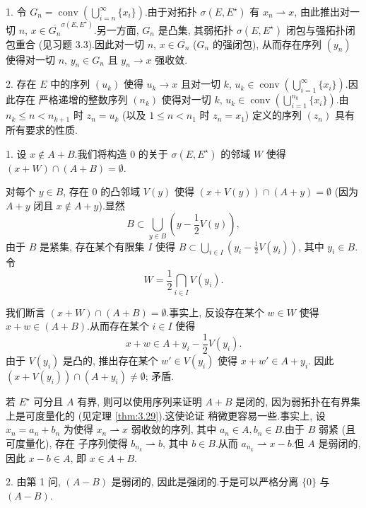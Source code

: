 
1. 令 $G_n=\operatorname{conv}\left(\bigcup_{i=n}^\infty\{x_i\}\right)$.由于对拓扑
$\sigma(E,E^\star)$ 有 $x_n\rightharpoonup x$, 由此推出对一切 $n$,
$x\in\overline{G_n}^{\sigma(E,E^\star)}$.另一方面, $G_n$ 是凸集, 其弱拓扑
$\sigma(E,E^\star)$ 闭包与强拓扑闭包重合 (见习题 3.3).因此对一切 $n$,
$x\in\overline{G_n}$ ($G_n$ 的强闭包), 从而存在序列 $(y_n)$ 使得对一切 $n$,
$y_n\in G_n$ 且 $y_n\to x$ 强收敛.

2. 存在 $E$ 中的序列 $(u_k)$ 使得 $u_k\to x$ 且对一切 $k$,
$u_k\in\operatorname{conv}\left(\bigcup_{i=1}^\infty\{x_i\}\right)$.因此存在
严格递增的整数序列 $(n_k)$ 使得对一切 $k$,
$u_k\in\operatorname{conv}\left(\bigcup_{i=1}^{n_k}\{x_i\}\right)$.由
$n_k\le n<n_{k+1}$ 时 $z_n=u_k$ (以及 $1\le n<n_1$ 时 $z_n=x_1$) 定义的序列
$(z_n)$ 具有所有要求的性质.


1. 设 $x\notin A+B$.我们将构造 $0$ 的关于 $\sigma(E,E^\star)$ 的邻域 $W$
使得 $(x+W)\cap(A+B)=\emptyset$.

对每个 $y\in B$, 存在 $0$ 的凸邻域 $V(y)$ 使得 $(x+V(y))\cap(A+y)=\emptyset$
(因为 $A+y$ 闭且 $x\notin A+y$).显然
\begin{equation*}
B\subset\bigcup_{y\in B}\left(y-\frac12V(y)\right),
\end{equation*}
由于 $B$ 是紧集, 存在某个有限集 $I$ 使得
$B\subset\bigcup_{i\in I}\left(y_i-\frac12V(y_i)\right)$, 其中 $y_i\in B$.
令
\begin{equation*}
W=\frac12\bigcap_{i\in I}V(y_i).
\end{equation*}

我们断言 $(x+W)\cap(A+B)=\emptyset$.事实上, 反设存在某个 $w\in W$ 使得
$x+w\in(A+B)$.从而存在某个 $i\in I$ 使得
\begin{equation*}
x+w\in A+y_i-\frac12V(y_i).
\end{equation*}
由于 $V(y_i)$ 是凸的, 推出存在某个 $w'\in V(y_i)$ 使得 $x+w'\in A+y_i$.
因此 $(x+V(y_i))\cap(A+y_i)\ne\emptyset$; 矛盾.

 若 $E^\star$ 可分且 $A$ 有界, 则可以使用序列来证明 $A+B$
是闭的, 因为弱拓扑在有界集上是可度量化的 (见定理  \ref{thm:3.29}).这使论证
稍微更容易一些.事实上, 设 $x_n=a_n+b_n$ 为使得 $x_n\rightharpoonup x$
弱收敛的序列, 其中 $a_n\in A,b_n\in B$.由于 $B$ 弱紧 (且可度量化), 存在
子序列使得 $b_{n_k}\rightharpoonup b$, 其中 $b\in B$.从而
$a_{n_k}\rightharpoonup x-b$.但 $A$ 是弱闭的, 因此 $x-b\in A$, 即
$x\in A+B$.

2. 由第 1 问, $(A-B)$ 是弱闭的, 因此是强闭的.于是可以严格分离 $\{0\}$ 与
$(A-B)$.

